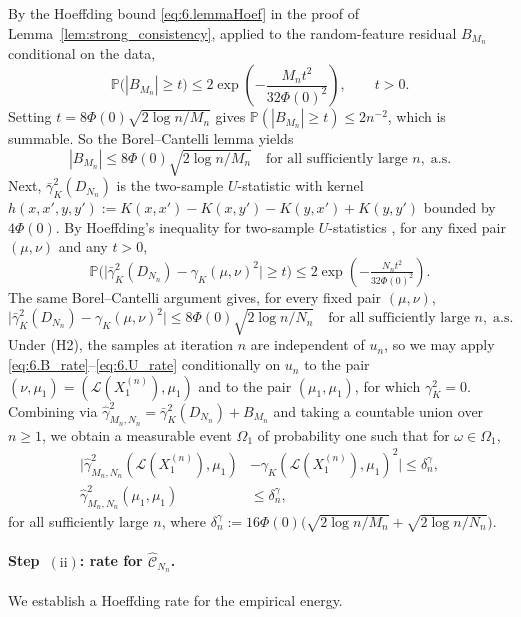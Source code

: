 \documentclass[11pt,leqno]{article}
\theoremstyle{plain}
\theoremstyle{remark}
\theoremstyle{definition}
\numberwithin{equation}{section}
\numberwithin{figure}{section}
\numberwithin{table}{section}
\numberwithin{algorithm}{section}
\begin{document}
By the Hoeffding bound \eqref{eq:6.lemmaHoef} in the proof of Lemma~\ref{lem:strong_consistency},
applied to the random-feature residual $B_{M_n}$ conditional on the data,
\[
 \mathbb{P}\bigl(|B_{M_n}|\ge t\bigr)
 \le 2\exp\left(-\frac{M_n t^2}{32\Phi(0)^2}\right), \qquad t>0.
\]
Setting $t = 8\Phi(0)\sqrt{2\log n / M_n}$ gives $\mathbb{P}(|B_{M_n}|\ge t)\le 2n^{-2}$,
which is summable. So the Borel--Cantelli lemma yields
\begin{equation}\label{eq:6.B_rate}
 |B_{M_n}|\le 8\Phi(0)\sqrt{2\log n / M_n}\quad\text{for all sufficiently large }n,\;\text{a.s.}
\end{equation}
Next, $\bar{\gamma}_K^2(D_{N_n})$ is the two-sample $U$-statistic with kernel
$h(x,x',y,y'):=K(x,x')-K(x,y')-K(y,x')+K(y,y')$ bounded by $4\Phi(0)$.
By Hoeffding's inequality for two-sample $U$-statistics \cite[Theorem~5.6.1.A]{ser:1980},
for any fixed pair $(\mu,\nu)$ and any $t>0$,
\[
 \mathbb{P}\bigl(\bigl|\bar{\gamma}_K^2(D_{N_n}) - \gamma_K(\mu,\nu)^2\bigr|\ge t\bigr)
 \le 2\exp\!\left(-\tfrac{N_n t^2}{32\Phi(0)^2}\right).
\]
The same Borel--Cantelli argument gives, for every fixed pair $(\mu,\nu)$,
\begin{equation}\label{eq:6.U_rate}
 \bigl|\bar{\gamma}_K^2(D_{N_n}) - \gamma_K(\mu,\nu)^2\bigr|
 \le 8\Phi(0)\sqrt{2\log n / N_n}\quad\text{for all sufficiently large }n,\;\text{a.s.}
\end{equation}
Under (H2), the samples at iteration $n$ are independent of $u_n$, so we may apply
\eqref{eq:6.B_rate}--\eqref{eq:6.U_rate} conditionally on $u_n$
to the pair $(\nu,\mu_1) = (\mathcal{L}(X_1^{(n)}),\mu_1)$ and to the pair $(\mu_1,\mu_1)$, for which $\gamma_K^2=0$.
Combining via $\hat{\gamma}_{M_n,N_n}^2 = \bar{\gamma}_K^2(D_{N_n}) + B_{M_n}$ and taking a countable union over $n\ge 1$, we obtain a measurable event $\Omega_1$ of probability one such that for $\omega\in\Omega_1$,
\begin{equation}\label{eq:6.gamma_rate}
\begin{aligned}
 \bigl|\hat{\gamma}_{M_n,N_n}^2(\mathcal{L}(X_1^{(n)}),\mu_1)
 &- \gamma_K(\mathcal{L}(X_1^{(n)}),\mu_1)^2\bigr|\le \delta^\gamma_n,\\
 \hat{\gamma}_{M_n,N_n}^2(\mu_1,\mu_1)&\le \delta^\gamma_n,
\end{aligned}
\end{equation}
for all sufficiently large $n$, where
$\delta^\gamma_n := 16\Phi(0)\bigl(\sqrt{2\log n/M_n}+\sqrt{2\log n/N_n}\bigr)$.

\paragraph{Step~$(\mathrm{ii})$: rate for $\hat{\mathcal{C}}_{N_n}$.}
We establish a Hoeffding rate for the empirical energy.
\end{document}
